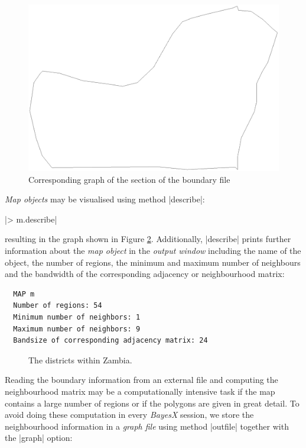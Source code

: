 \begin{figure}[h]
\centering
\includegraphics [scale=0.3]{grafiken/zambia52.ps}
\caption{\label{reml:zambia52} Corresponding graph of the section of
the boundary file}
\end{figure}

{\it Map objects} may be visualised using method |describe|:

|> m.describe|

resulting in the graph shown in Figure \ref{reml:zambiamap}. Additionally, |describe| prints further information about the {\it
map object} in the {\it output window} including the name of the object, the number of regions, the minimum and maximum number
of neighbours and the bandwidth of the corresponding adjacency or neighbourhood matrix:

\begin{verbatim}
  MAP m
  Number of regions: 54
  Minimum number of neighbors: 1
  Maximum number of neighbors: 9
  Bandsize of corresponding adjacency matrix: 24
\end{verbatim}

\begin{figure}[ht]
\begin{center}
 {\it\caption{The
districts within Zambia.\label{reml:zambiamap}}}
\end{center}
\end{figure}

Reading the boundary information from an external file and computing the neighbourhood matrix may be a computationally
intensive task if the map contains a large number of regions or if the polygons are given in great detail. To avoid doing these
computation in every {\it BayesX} session, we store the neighbourhood information in a {\it graph file} using method |outfile|
together with the |graph| option:

